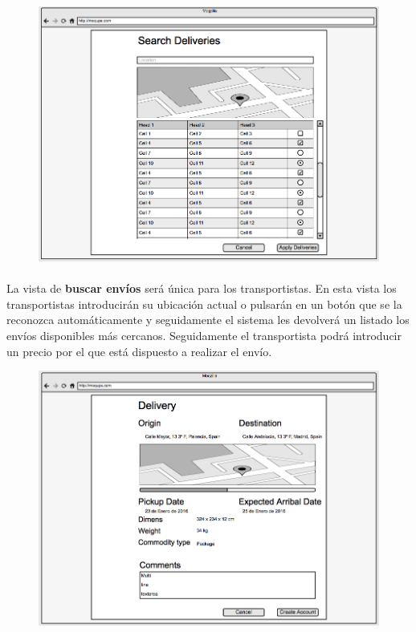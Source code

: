 \documentclass[10pt, a4paper,spanish]{article}
\begin{document}
			\begin{figure}[H]
				\centering
				\begin{minipage}[b]{0.7\textwidth}
					\includegraphics[width=\textwidth]{res/sketch_search_deliveries.png}

				\end{minipage}
			\end{figure}

			\paragraph{}
			La vista de \textbf{buscar envíos} será única para los transportistas. En esta vista los transportistas introducirán su ubicación actual o pulsarán en un botón que se la reconozca automáticamente y seguidamente el sistema les devolverá un listado los envíos disponibles más cercanos. Seguidamente el transportista podrá introducir un precio por el que está dispuesto a realizar el envío.


			\begin{figure}[H]
				\centering
				\begin{minipage}[b]{0.7\textwidth}
					\includegraphics[width=\textwidth]{res/sketch_delivery.png}

				\end{minipage}
			\end{figure}
\end{document}
